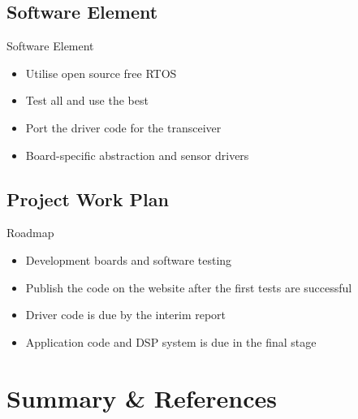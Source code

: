 \documentclass{beamer}
\begin{document}
\subsection{Software Element}
\begin{frame}{Software Element}

\begin{itemize}

	\item Utilise open source free RTOS

	\item Test all and use the best

	\item Port the driver code for the transceiver
	
	\item Board-specific abstraction and sensor drivers

\end{itemize}
\end{frame}

\subsection{Project Work Plan}

\begin{frame}{Roadmap}

\begin{itemize}

	\item Development boards and software testing \pause
	\item Publish the code on the website
	\newline after the first tests are successful \pause

	\item Driver code is due by the interim report \pause

	\item Application code and DSP system is due in the final stage

\end{itemize}
\end{frame}


\section{Summary \& References}
\end{document}
